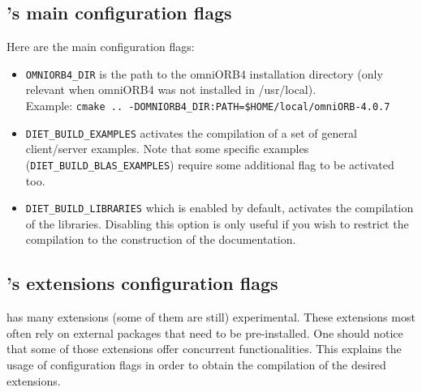 \subsection{\diet's main configuration flags}

Here are the main configuration flags:
\begin{itemize}
\item
  \verb+OMNIORB4_DIR+ is the path to the omniORB4 installation
  directory (only relevant when omniORB4 was not installed in
  /usr/local).\\ Example:
  \verb+cmake .. -DOMNIORB4_DIR:PATH=$HOME/local/omniORB-4.0.7+

\item
  \verb+DIET_BUILD_EXAMPLES+ activates the compilation of a set of
  general client/server examples. Note that some specific examples
  (\eg \verb+DIET_BUILD_BLAS_EXAMPLES+) require some additional flag
  to be activated too.

\item
  \verb+DIET_BUILD_LIBRARIES+ which is enabled by default, activates the
  compilation of the \diet libraries. Disabling this option is only useful if
  you wish to restrict the compilation to the construction of the
  documentation.
\end{itemize}

\subsection{\diet's extensions configuration flags}

\diet has many extensions (some of them are still) experimental. These
extensions most often rely on external packages that need to be
pre-installed. One should notice that some of those extensions offer concurrent
functionalities. This explains the usage of configuration flags in order to
obtain the compilation of the desired extensions.

